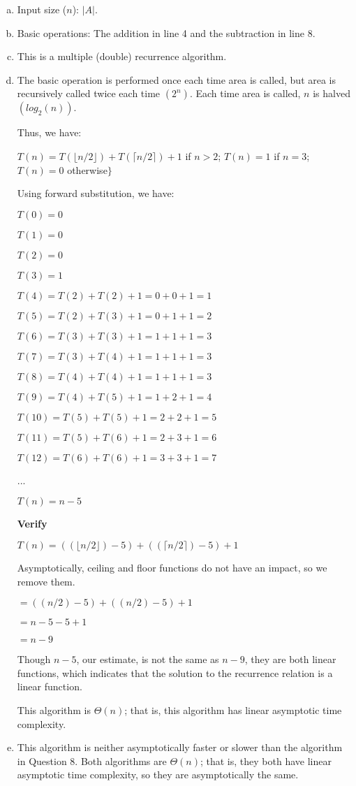 \documentclass{article}
\begin{document}
	\begin{enumerate}[a.]
		\item Input size ($n$): $|A|$.
		
		\item Basic operations: The addition in line 4 and the subtraction in line 8.
		
		\item This is a multiple (double) recurrence algorithm.
		
		\item The basic operation is performed once each time area is called, but area is recursively called twice each time $(2^n)$.  Each time area is called, $n$ is halved $(log_{2}(n))$.
		
		Thus, we have:
		
		$T(n) = T(\lfloor n/2 \rfloor) + T(\lceil n/2 \rceil) + 1$ if $n > 2$; $T(n) = 1$ if $n = 3$; $T(n) = 0$ otherwise$\}$
		
		Using forward substitution, we have:
		
		$T(0) = 0$
		
		$T(1) = 0$
		
		$T(2) = 0$
		
		$T(3) = 1$
		
		$T(4) = T(2) + T(2) + 1 = 0 + 0 + 1 = 1$
		
		$T(5) = T(2) + T(3) + 1 = 0 + 1 + 1 = 2$
		
		$T(6) = T(3) + T(3) + 1 = 1 + 1 + 1 = 3$
		
		$T(7) = T(3) + T(4) + 1 = 1 + 1 + 1 = 3$
		
		$T(8) = T(4) + T(4) + 1 = 1 + 1 + 1 = 3$
		
		$T(9) = T(4) + T(5) + 1 = 1 + 2 + 1 = 4$
		
		$T(10) = T(5) + T(5) + 1 = 2 + 2 + 1 = 5$
		
		$T(11) = T(5) + T(6) + 1 = 2 + 3 + 1 = 6$
		
		$T(12) = T(6) + T(6) + 1 = 3 + 3 + 1 = 7$
		
		...
		
		$T(n) = n - 5$
		
		\textbf{Verify}
		
		$T(n) = ((\lfloor n/2 \rfloor) - 5) + ((\lceil n/2 \rceil) - 5) + 1$
		
		Asymptotically, ceiling and floor functions do not have an impact, so we remove them.
		
		$ = ((n/2) - 5) + ((n/2) - 5) + 1$
		
		$ = n - 5 - 5 + 1$
		
		$ = n - 9$
		
		Though $n - 5$, our estimate, is not the same as $n - 9$, they are both linear functions, which indicates that the solution to the recurrence relation is a linear function.
		
		This algorithm is $\Theta(n)$; that is, this algorithm has linear asymptotic time complexity.
		
		\item This algorithm is neither asymptotically faster or slower than the algorithm in Question 8.  Both algorithms are $\Theta(n)$; that is, they both have linear asymptotic time complexity, so they are asymptotically the same.
	\end{enumerate}
\end{document}

